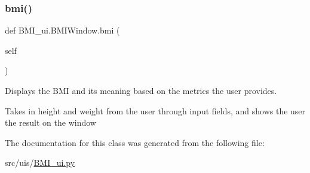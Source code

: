 \subsubsection{\texorpdfstring{bmi()}{bmi()}}
{\footnotesize\ttfamily def B\+M\+I\+\_\+ui.\+B\+M\+I\+Window.\+bmi (\begin{DoxyParamCaption}\item[{}]{self }\end{DoxyParamCaption})}



Displays the B\+MI and its meaning based on the metrics the user provides. 

Takes in height and weight from the user through input fields, and shows the user the result on the window 

The documentation for this class was generated from the following file\+:\begin{DoxyCompactItemize}
\item 
src/uis/\hyperlink{_b_m_i__ui_8py}{B\+M\+I\+\_\+ui.\+py}\end{DoxyCompactItemize}
